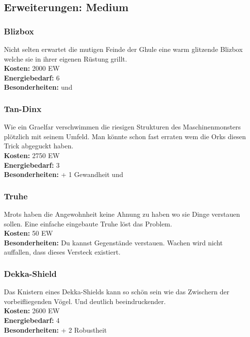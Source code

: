 \subsection*{Erweiterungen: Medium}

\subsubsection*{Blizbox}
Nicht selten erwartet die mutigen Feinde der Ghule eine warm glitzende Blizbox welche sie in ihrer eigenen Rüstung grillt. \\
\textbf{Kosten:} 2000 EW\\
\textbf{Energiebedarf:} 6 \\
\textbf{Besonderheiten:} \textit{} und \textit{}

\subsubsection*{Tan-Dinx}
Wie ein Graelfar verschwimmen die riesigen Strukturen des Maschinenmonsters plötzlich mit seinem Umfeld. Man könnte schon fast erraten wem die Orks diesen Trick abgeguckt haben. \\
\textbf{Kosten:} 2750 EW\\
\textbf{Energiebedarf:} 3 \\
\textbf{Besonderheiten:} + 1 Gewandheit und \textit{}

\subsubsection*{Truhe}
Mrots haben die Angewohnheit keine Ahnung zu haben wo sie Dinge verstauen sollen. Eine einfache eingebaute Truhe löst das Problem. \\
\textbf{Kosten:} 50 EW\\
\textbf{Besonderheiten:} Du kannst Gegenstände verstauen. Wachen wird nicht auffallen, dass dieses Versteck existiert.

\subsubsection*{Dekka-Shield}
Das Knistern eines Dekka-Shields kann so schön sein wie das Zwischern der vorbeifliegenden Vögel. Und deutlich beeindruckender. \\
\textbf{Kosten:} 2600 EW\\
\textbf{Energiebedarf:} 4 \\
\textbf{Besonderheiten:} + 2 Robustheit

